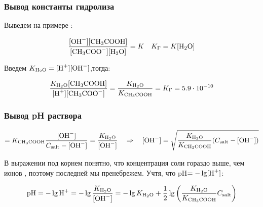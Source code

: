 \documentclass[a4paper, 12pt]{article}
\newcommand{\qrq}
{\ensuremath{\quad \Rightarrow \quad}} %
\begin{document}
\subsubsection*{Вывод константы гидролиза}

Выведем на примере :



\begin{equation*}
	\frac{[\ce{OH-}][\ce{CH3COOH}]}{[\ce{CH3COO-}][\ce{H2O}]} = K \quad K_\Gamma = K[\ce{H2O}] 
\end{equation*}

Введем $K_{\ce{H2O}} = [\ce{H+}][\ce{OH-}]$,тогда:

\begin{equation*}
	\frac{K_{\ce{H2O}}[\ce{CH3COOH}]}{[\ce{H+}][\ce{CH3COO-}]} = \frac{K_{\ce{H2O}}}{K_{\ce{CH3COOH}}} = K_\Gamma = 5.9 \cdot 10^{-10}
\end{equation*}

\subsubsection*{Вывод pH раствора}

\begin{equation*}
	[\ce{H+}] = K_{\ce{CH3COOH}} \frac{[\ce{OH-}]}{C_{\text{salt}} - [\ce{OH-}]} = \frac{K_{\ce{H2O}}}{[\ce{OH-}]} \qrq [\ce{OH-}] = \sqrt{\frac{K_{\ce{H2O}}}{K_{\ce{CH3COOH}}} (C_{\text{salt}} - [\ce{OH-}])}
\end{equation*}

В выражении под корнем понятно, что концентрация соли гораздо выше, чем ионов , поэтому последней мы пренебрежем. Учтя, что pH$=-\lg[\ce{H+}]$:

\begin{equation*}
	\text{pH} = -\lg\ce{H+} = -\lg\frac{K_{\ce{H2O}}}{[\ce{OH-}]} = -\lg K_{\ce{H2O}} + \frac{1}{2}\lg \left(\frac{K_{\ce{H2O}}}{K_{\ce{CH3COOH}}} C_{\text{salt}}\right)
\end{equation*}
\end{document}
